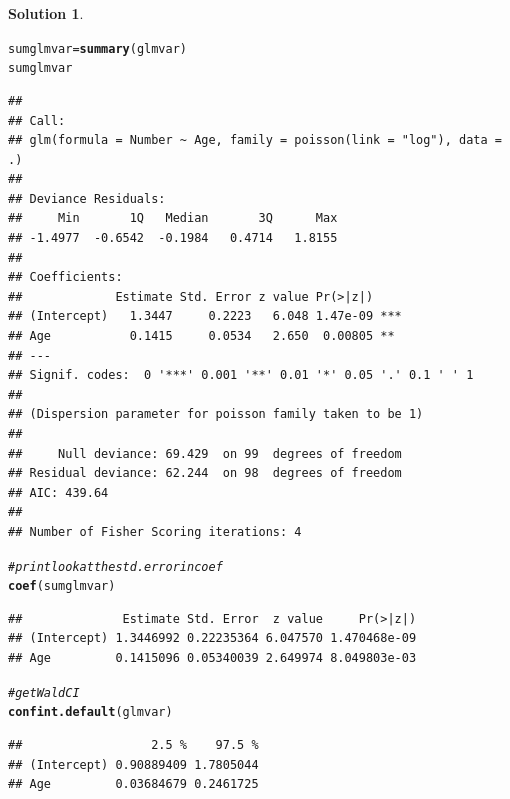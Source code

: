 \documentclass[11pt,letterpaper,english,oneside]{article}\usepackage[]{graphicx}\usepackage[]{color}
\makeatletter
\newcommand{\hlcom}[1]{\textcolor[rgb]{0.678,0.584,0.686}{\textit{#1}}}%
\newcommand{\hlstd}[1]{\textcolor[rgb]{0.345,0.345,0.345}{#1}}%
\newcommand{\hlkwb}[1]{\textcolor[rgb]{0.69,0.353,0.396}{#1}}%
\newcommand{\hlkwd}[1]{\textcolor[rgb]{0.737,0.353,0.396}{\textbf{#1}}}%
\newenvironment{kframe}{%
 \def\at@end@of@kframe{}%
 \ifinner\ifhmode%
  \def\at@end@of@kframe{\end{minipage}}%
  \begin{minipage}{\columnwidth}%
 \fi\fi%
 \def\FrameCommand##1{\hskip\@totalleftmargin \hskip-\fboxsep
 \colorbox{shadecolor}{##1}\hskip-\fboxsep
     \hskip-\linewidth \hskip-\@totalleftmargin \hskip\columnwidth}%
 \MakeFramed {\advance\hsize-\width
   \@totalleftmargin\z@ \linewidth\hsize
   \@setminipage}}%
 {\par\unskip\endMakeFramed%
 \at@end@of@kframe}
\newenvironment{knitrout}{}{} %
\theoremstyle{definition} %
\newtheorem{solution}{Solution}
\newenvironment{sol}{\begin{solution}\hspace{0pt}}{\end{solution}}
\makeatother
\begin{document}
\begin{sol}
\begin{enumerate}
\begin{knitrout}
\begin{kframe}
\begin{alltt}
\hlstd{sumglmvar} \hlkwb{=} \hlkwd{summary}\hlstd{(glmvar)}
\hlstd{sumglmvar}
\end{alltt}
\begin{verbatim}
## 
## Call:
## glm(formula = Number ~ Age, family = poisson(link = "log"), data = .)
## 
## Deviance Residuals: 
##     Min       1Q   Median       3Q      Max  
## -1.4977  -0.6542  -0.1984   0.4714   1.8155  
## 
## Coefficients:
##             Estimate Std. Error z value Pr(>|z|)    
## (Intercept)   1.3447     0.2223   6.048 1.47e-09 ***
## Age           0.1415     0.0534   2.650  0.00805 ** 
## ---
## Signif. codes:  0 '***' 0.001 '**' 0.01 '*' 0.05 '.' 0.1 ' ' 1
## 
## (Dispersion parameter for poisson family taken to be 1)
## 
##     Null deviance: 69.429  on 99  degrees of freedom
## Residual deviance: 62.244  on 98  degrees of freedom
## AIC: 439.64
## 
## Number of Fisher Scoring iterations: 4
\end{verbatim}
\begin{alltt}
\hlcom{#print look at the std. error in coef}
\hlkwd{coef}\hlstd{(sumglmvar)}
\end{alltt}
\begin{verbatim}
##              Estimate Std. Error  z value     Pr(>|z|)
## (Intercept) 1.3446992 0.22235364 6.047570 1.470468e-09
## Age         0.1415096 0.05340039 2.649974 8.049803e-03
\end{verbatim}
\end{kframe}
\end{knitrout}


\begin{knitrout}
\color{fgcolor}\begin{kframe}
\begin{alltt}
\hlcom{#get Wald CI}
\hlkwd{confint.default}\hlstd{(glmvar)}
\end{alltt}
\begin{verbatim}
##                  2.5 %    97.5 %
## (Intercept) 0.90889409 1.7805044
## Age         0.03684679 0.2461725
\end{verbatim}
\end{kframe}
\end{knitrout}


\end{enumerate}
\end{sol}
\end{document}
